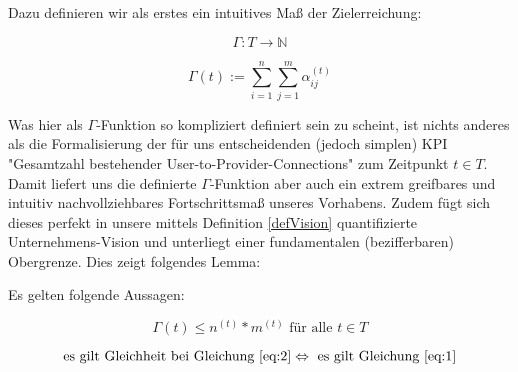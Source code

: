 \documentclass[11pt]{scrartcl}
\begin{document}
Dazu definieren wir als erstes ein intuitives Maß der Zielerreichung:

\vspace{0.3cm}

\begin{Def}\label{defGamma}
\begin{equation*}
  \Gamma : T \rightarrow \mathbb{N} 
\end{equation*}

\begin{equation*}
  \Gamma(t):= \sum_{i=1}^n \sum_{j=1}^m \alpha^{(t)}_{ij} 
\end{equation*}

\end{Def}

\vspace{1cm}

Was hier als $\Gamma$-Funktion so kompliziert definiert sein zu scheint, ist nichts anderes als die Formalisierung der für uns entscheidenden (jedoch simplen) KPI "Gesamtzahl bestehender User-to-Provider-Connections" zum Zeitpunkt $t \in T$. Damit liefert uns die definierte $\Gamma$-Funktion aber auch ein extrem greifbares und intuitiv nachvollziehbares Fortschrittsmaß unseres Vorhabens. Zudem fügt sich dieses perfekt in unsere mittels Definition \ref{defVision} quantifizierte Unternehmens-Vision und unterliegt einer fundamentalen (bezifferbaren) Obergrenze. Dies zeigt folgendes Lemma:

\vspace{0.3cm}

\begin{Lemma}

Es gelten folgende Aussagen:

\begin{equation}
\label{eq:2}
  \Gamma(t) \leq n^{(t)} * m^{(t)} \textrm{ für alle } t \in T 
\end{equation}

\begin{equation}
\label{eq:3}
  \textrm{es gilt Gleichheit bei Gleichung }  \eqref{eq:2} \Leftrightarrow \textrm{ es gilt Gleichung } \eqref{eq:1}
\end{equation}

\end{Lemma}

\vspace{0.3cm}
\end{document}
